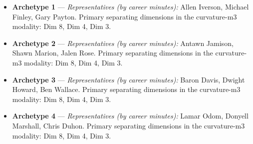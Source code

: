 \begin{itemize}
\item \textbf{Archetype 1} --- \emph{Representatives (by career minutes):} Allen Iverson, Michael Finley, Gary Payton. Primary separating dimensions in the curvature-m3 modality: Dim 8, Dim 4, Dim 3.
\item \textbf{Archetype 2} --- \emph{Representatives (by career minutes):} Antawn Jamison, Shawn Marion, Jalen Rose. Primary separating dimensions in the curvature-m3 modality: Dim 8, Dim 4, Dim 3.
\item \textbf{Archetype 3} --- \emph{Representatives (by career minutes):} Baron Davis, Dwight Howard, Ben Wallace. Primary separating dimensions in the curvature-m3 modality: Dim 8, Dim 4, Dim 3.
\item \textbf{Archetype 4} --- \emph{Representatives (by career minutes):} Lamar Odom, Donyell Marshall, Chris Duhon. Primary separating dimensions in the curvature-m3 modality: Dim 8, Dim 4, Dim 3.
\end{itemize}
